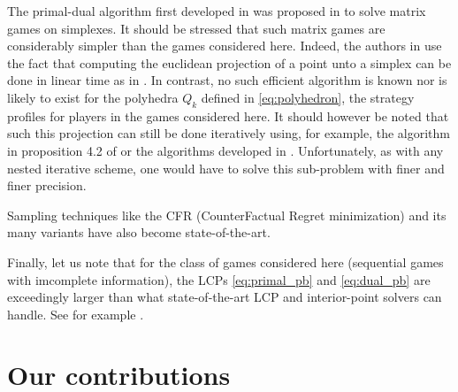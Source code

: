 \documentclass{article} %
\begin{document}


The primal-dual algorithm first developed in \cite{chambolle2010} was
proposed \cite{chambolle2014ergodic} in to solve matrix games on
simplexes. It should be stressed that such matrix games are
considerably simpler than the games considered here. Indeed, the
authors in \cite{chambolle2014ergodic} use the fact that computing the
euclidean projection of a point unto a simplex can be done in linear
time as in \cite{duchi2008efficient}. In contrast, no such efficient
algorithm is known nor is likely to exist for the polyhedra $Q_k$
defined in \eqref{eq:polyhedron}, the strategy profiles for players in
the games considered here. It should however be noted that such this
projection can still be done iteratively using, for example, the
algorithm in proposition 4.2 of \cite{combettes2010dualization} or the
algorithms developed in \cite{tran2015splitting}. Unfortunately, as
with any nested iterative scheme, one would have to solve this
sub-problem with finer and finer precision.


Sampling techniques like the CFR (CounterFactual Regret minimization)
and its many variants
\cite{MartinZinkevichNIPS2007,lanctot2009monte,Bowling09012015} have
also become state-of-the-art.

Finally, let us note that for the class of games considered here
(sequential games with imcomplete information), the LCPs
\eqref{eq:primal_pb} and \eqref{eq:dual_pb} are exceedingly larger
than what state-of-the-art LCP and interior-point solvers can
handle. See for example \cite{hoda2010smoothing}.


\section{Our contributions}
\end{document}
